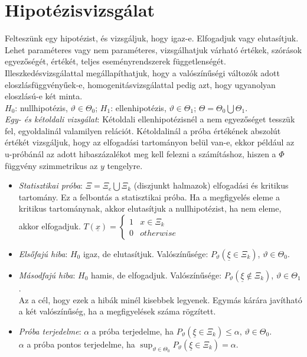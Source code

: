\documentclass[margin=0px]{article}
\begin{document}
	\section{Hipotézisvizsgálat}
	
	Felteszünk egy hipotézist, és vizsgáljuk, hogy igaz-e. Elfogadjuk vagy elutasítjuk. Lehet paraméteres vagy nem paraméteres, vizsgálhatjuk várható értékek, szórások egyezőségét, értékét, teljes eseményrendszerek függetlenségét. Illeszkedésvizsgálattal megállapíthatjuk, hogy a valószínűségi változók adott eloszlásfüggvényűek-e, homogenitásvizsgálattal pedig azt, hogy ugyanolyan eloszlású-e két minta. \\
	$H_0$: nullhipotézis, $\vartheta \in \Theta_0$; $H_1$: ellenhipotézis, $\vartheta \in \Theta_1$; $\Theta = \Theta_0 \bigcup \Theta_1$. \\
	\textit{Egy- és kétoldali vizsgálat}: Kétoldali ellenhipotézisnél a nem egyezőséget tesszük fel, egyoldalinál valamilyen relációt. Kétoldalinál a próba értékének abszolút értékét vizsgáljuk, hogy az elfogadási tartományon belül van-e, ekkor például az u-próbánál az adott hibaszázalékot meg kell felezni a számításhoz, hiszen a $\Phi$ függvény szimmetrikus az $y$ tengelyre.
	\begin{itemize}
	\item \textit{Statisztikai próba}: $\Xi = \Xi_e \bigcup \Xi_k$ (diszjunkt halmazok) elfogadási és kritikus tartomány. Ez a felbontás a statisztikai próba. Ha a megfigyelés eleme a kritikus tartománynak, akkor elutasítjuk a nullhipotézist, ha nem eleme, akkor elfogadjuk. $T(\underline{x}) = \left\{\begin{array} {lr} 1 & x \in \Xi_k \\ 0 & otherwise \end{array}\right.$
	\item \textit{Elsőfajú hiba}: $H_0$ igaz, de elutasítjuk. Valószínűsége: $P_{\vartheta}(\underline{\xi} \in \Xi_k)$, $\vartheta \in \Theta_0$.
	\item \textit{Másodfajú hiba}: $H_0$ hamis, de elfogadjuk. Valószínűsége: $P_{\vartheta}(\underline{\xi} \notin \Xi_k)$, $\vartheta \in \Theta_1$. \\
	Az a cél, hogy ezek a hibák minél kisebbek legyenek. Egymás kárára javítható a két valószínűség, ha a megfigyelések száma rögzített.
	\item \textit{Próba terjedelme}: $\alpha$ a próba terjedelme, ha $P_{\vartheta}(\underline{\xi} \in \Xi_k) \leq \alpha$, $\vartheta \in \Theta_0$. \\
	$\alpha$ a próba pontos terjedelme, ha $\sup_{\vartheta \in \Theta_0}{P_{\vartheta}(\underline{\xi} \in \Xi_k) = \alpha}$.
	\end{itemize}
	
\end{document}
